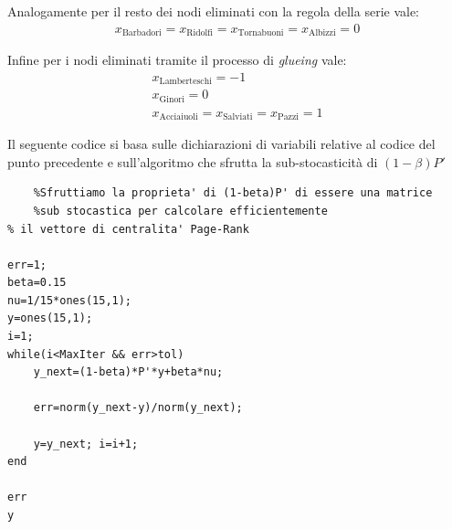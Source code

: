 \documentclass[11pt,largemargins]{homework}
\begin{document}
\begin{alphaparts}
  Analogamente per il resto dei nodi eliminati con la regola della serie vale:
  \begin{gather*}
    x_{\text{Barbadori}}=x_{\text{Ridolfi}}=x_{\text{Tornabuoni}}=x_{\text{Albizzi}}=0
  \end{gather*}

  Infine per i nodi eliminati tramite il processo di \textit{glueing} vale:
  \begin{gather*}
    x_{\text{Lamberteschi}}=-1 \\ x_{\text{Ginori}}=0 \\
    x_{\text{Acciaiuoli}}=x_{\text{Salviati}}=x_{\text{Pazzi}}=1
  \end{gather*}


  \questionpart

  Il seguente codice si basa sulle dichiarazioni di variabili relative al codice del punto precedente e sull'algoritmo che sfrutta la sub-stocasticità di \((1-\beta)P'\)

  \begin{lstlisting}
    %Sfruttiamo la proprieta' di (1-beta)P' di essere una matrice 
    %sub stocastica per calcolare efficientemente
% il vettore di centralita' Page-Rank
    
err=1;
beta=0.15
nu=1/15*ones(15,1);
y=ones(15,1);
i=1;
while(i<MaxIter && err>tol)
    y_next=(1-beta)*P'*y+beta*nu;
    
    err=norm(y_next-y)/norm(y_next);
    
    y=y_next; i=i+1;
end

err
y
  \end{lstlisting}


\end{alphaparts}
  
    



  
\end{document}
